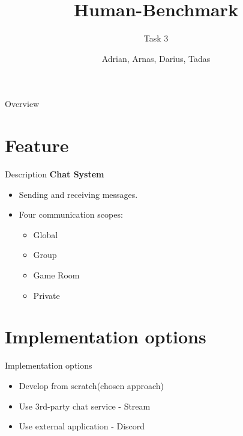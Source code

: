 \documentclass[aspectratio=169,xcolor=dvipsnames]{beamer}
\title{Human-Benchmark}
\subtitle{Task 3}
\author{Adrian, Arnas, Darius, Tadas}
\institute
{
    Matematikos ir informatikos fakultetas \\
    Vilniaus universitetas %
}
\begin{document}
\begin{frame}
    \titlepage
\end{frame}

\begin{frame}{Overview}
    \tableofcontents
\end{frame}

\section{Feature}
\begin{frame}{Description}
\textbf{Chat System}
\begin{itemize}
    \item Sending and receiving messages.
    \item Four communication scopes:
    \begin{itemize}
        \item Global
        \item Group
        \item Game Room
        \item Private
    \end{itemize}
\end{itemize}
\end{frame}

\section{Implementation options}
\begin{frame}{Implementation options}
\begin{itemize}
    \item Develop from scratch(chosen approach)
    \item Use 3rd-party chat service - Stream
    \item Use external application - Discord
\end{itemize}
\end{frame}
\end{document}
